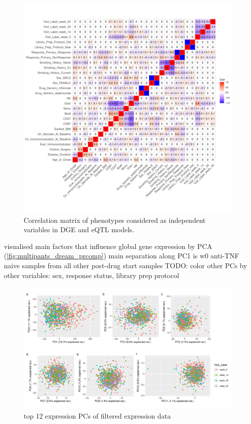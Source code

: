 \begin{outline}
\begin{figure}
    \centering
    \includegraphics[width=1.0\textwidth,page=1]{mainmatter/figures/chapter_04/process_pheno.pheno_filtered_dge.ggcorrplot.pdf}
    \caption{Correlation matrix of phenotypes considered as independent variables in DGE and eQTL models.}
    \label{fig:multipants_pheno_filtered_ggcorrplot}
\end{figure}

\1 visualised main factors that influence global gene expression by PCA (\autoref{fig:multipants_dream_prcomp})
    \2 main separation along PC1 is w0 anti-TNF naive samples from all other post-drug start samples 
    \2 TODO: color other PCs by other variables: sex, response status, library prep protocol

\begin{figure}
    \centering
    \includegraphics[width=1.0\textwidth,page=1]{mainmatter/figures/chapter_04/dream.prcomp.pdf}
    \caption{top 12 expression PCs of filtered expression data}
    \label{fig:multipants_dream_prcomp}
\end{figure}


\end{outline}
